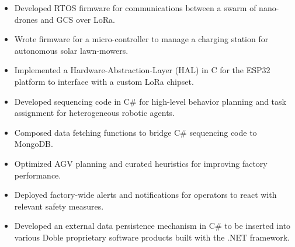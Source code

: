 \documentclass[10pt,a4paper,ragged2e,withhyper]{altacv}
\begin{document}
\begin{paracol}{2}
    \vspace{-3em} %
    \begin{itemize}
        \item Developed RTOS firmware for communications between a swarm of nano-drones and GCS over LoRa.
        \item Wrote firmware for a micro-controller to manage a charging station for autonomous solar lawn-mowers.
        \item Implemented a Hardware-Abstraction-Layer (HAL) in C for the ESP32 platform to interface with a custom LoRa chipset.
    \end{itemize}
    \begin{itemize}
        \item Developed sequencing code in C\# for high-level behavior planning and task assignment for heterogeneous robotic agents.
        \item Composed data fetching functions to bridge C\# sequencing code to MongoDB.
        \item Optimized AGV planning and curated heuristics for improving factory performance.
        \item Deployed factory-wide alerts and notifications for operators to react with relevant safety measures.
    \end{itemize}
    \begin{itemize}
        \item Developed an external data persistence mechanism in C\# to be inserted into various Doble proprietary software products built with the .NET framework.

\end{itemize}
\end{paracol}
\end{document}
